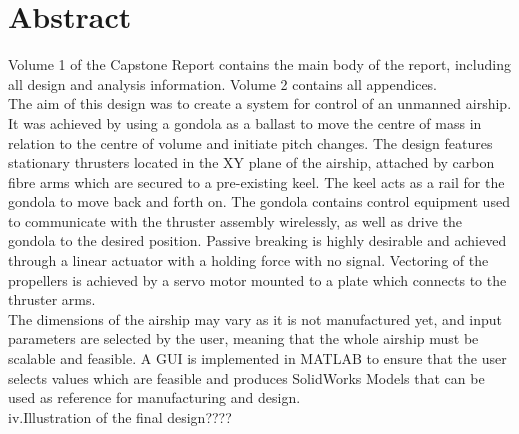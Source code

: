 \documentclass[]{book}
\begin{document}
\frontmatter

\chapter*{Abstract}
Volume 1 of the Capstone Report contains the main body of the report, including all design and analysis information. Volume 2 contains all appendices.\\

The aim of this design was to create a system for control of an unmanned airship. It was achieved by using a gondola as a ballast to move the centre of mass in relation to the centre of volume and initiate pitch changes. The design features stationary thrusters located in the XY plane of the airship, attached by carbon fibre arms which are secured to a pre-existing keel. The keel acts as a rail for the gondola to move back and forth on. The gondola contains control equipment used to communicate with the thruster assembly wirelessly, as well as drive the gondola to the desired position. Passive breaking is highly desirable and achieved through a linear actuator with a holding force with no signal. Vectoring of the propellers is achieved by a servo motor mounted to a plate which connects to the thruster arms.\\

The dimensions of the airship may vary as it is not manufactured yet, and input parameters are selected by the user, meaning that the whole airship must be scalable and feasible. A GUI is implemented in MATLAB to ensure that the user selects values which are feasible and produces SolidWorks Models that can be used as reference for manufacturing and design.\\

iv.Illustration of the final design????

\pagebreak

\tableofcontents

\listoffigures
\pagebreak

\listoftables
\pagebreak
\end{document}
